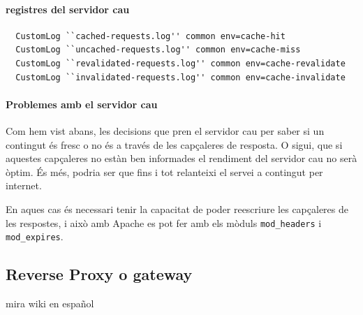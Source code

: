 \documentclass[a4paper, 11pt]{article}
\begin{document}
\paragraph{registres del servidor cau }

\begin{verbatim}
  CustomLog ``cached-requests.log'' common env=cache-hit
  CustomLog ``uncached-requests.log'' common env=cache-miss
  CustomLog ``revalidated-requests.log'' common env=cache-revalidate
  CustomLog ``invalidated-requests.log'' common env=cache-invalidate
\end{verbatim}


\paragraph{Problemes amb el servidor cau \\}

Com hem vist abans, les decisions que pren el servidor cau per saber si un contingut \'es fresc o no \'es a trav\'es de les capçaleres de resposta. O sigui, que si aquestes capçaleres no estàn ben informades el rendiment del servidor cau no serà òptim. \'Es m\'es, podria ser que fins i tot relanteixi el servei a contingut per internet.

En aques cas \'es necessari tenir la capacitat de poder reescriure les capçaleres de les respostes, i això amb Apache es pot fer amb els mòduls \verb+mod_headers+ i \verb+mod_expires+.




\subsection{Reverse Proxy o gateway}
mira wiki en español
\end{document}
